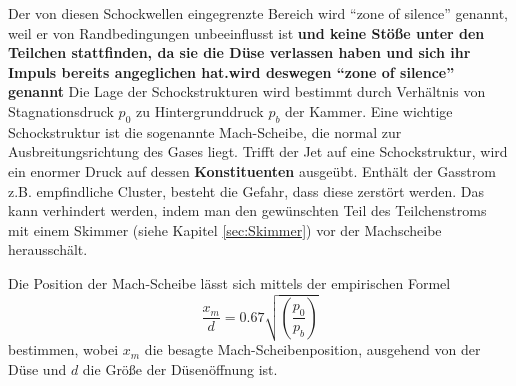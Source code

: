 % 
Der von diesen Schockwellen eingegrenzte Bereich wird \enquote{zone of silence} genannt, weil er von Randbedingungen unbeeinflusst ist \textbf{und keine Stöße unter den Teilchen stattfinden, da sie die Düse verlassen haben und sich ihr Impuls bereits angeglichen hat.wird deswegen \enquote{zone of silence} genannt}
Die Lage der Schockstrukturen wird bestimmt durch Verhältnis von Stagnationsdruck $p_0$ zu Hintergrunddruck $p_b$ der Kammer. Eine wichtige Schockstruktur ist die sogenannte Mach-Scheibe, die normal zur Ausbreitungsrichtung des Gases liegt. Trifft der Jet auf eine Schockstruktur, wird ein enormer Druck auf dessen \textbf{Konstituenten} ausgeübt. Enthält der Gasstrom z.B. empfindliche Cluster, besteht die Gefahr, dass diese zerstört werden. Das kann verhindert werden, indem man den gewünschten Teil des Teilchenstroms mit einem Skimmer (siehe Kapitel \ref{sec:Skimmer}) vor der Machscheibe herausschält.

Die Position der Mach-Scheibe lässt sich mittels der empirischen Formel
\begin{equation}
\frac{x_m}{d}=0.67 \sqrt{\left( \frac{p_0}{p_b}\right)}
\end{equation}
%
bestimmen, wobei $x_m$ die besagte Mach-Scheibenposition, ausgehend von der Düse und $d$ die Größe der Düsenöffnung ist.



